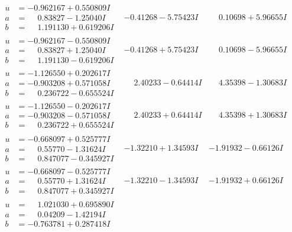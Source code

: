 \documentclass[1p]{elsarticle_modified}
\theoremstyle{definition}
\begin{document}
$$\begin{array}{c|c|c}
\begin{aligned}
u &= -0.962167 + 0.550809 I \\
a &= \phantom{-}0.83827 - 1.25040 I \\
b &= \phantom{-}1.191130 + 0.619206 I\end{aligned}
 & -0.41268 - 5.75423 I & \phantom{-}0.10698 + 5.96655 I \\ \hline\begin{aligned}
u &= -0.962167 - 0.550809 I \\
a &= \phantom{-}0.83827 + 1.25040 I \\
b &= \phantom{-}1.191130 - 0.619206 I\end{aligned}
 & -0.41268 + 5.75423 I & \phantom{-}0.10698 - 5.96655 I \\ \hline\begin{aligned}
u &= -1.126550 + 0.202617 I \\
a &= -0.903208 + 0.571058 I \\
b &= \phantom{-}0.236722 - 0.655524 I\end{aligned}
 & \phantom{-}2.40233 - 0.64414 I & \phantom{-}4.35398 - 1.30683 I \\ \hline\begin{aligned}
u &= -1.126550 - 0.202617 I \\
a &= -0.903208 - 0.571058 I \\
b &= \phantom{-}0.236722 + 0.655524 I\end{aligned}
 & \phantom{-}2.40233 + 0.64414 I & \phantom{-}4.35398 + 1.30683 I \\ \hline\begin{aligned}
u &= -0.668097 + 0.525777 I \\
a &= \phantom{-}0.55770 - 1.31624 I \\
b &= \phantom{-}0.847077 - 0.345927 I\end{aligned}
 & -1.32210 + 1.34593 I & -1.91932 - 0.66126 I \\ \hline\begin{aligned}
u &= -0.668097 - 0.525777 I \\
a &= \phantom{-}0.55770 + 1.31624 I \\
b &= \phantom{-}0.847077 + 0.345927 I\end{aligned}
 & -1.32210 - 1.34593 I & -1.91932 + 0.66126 I \\ \hline\begin{aligned}
u &= \phantom{-}1.021030 + 0.695890 I \\
a &= \phantom{-}0.04209 - 1.42194 I \\
b &= -0.763781 + 0.287418 I\end{aligned}

\end{array}$$
\end{document}
